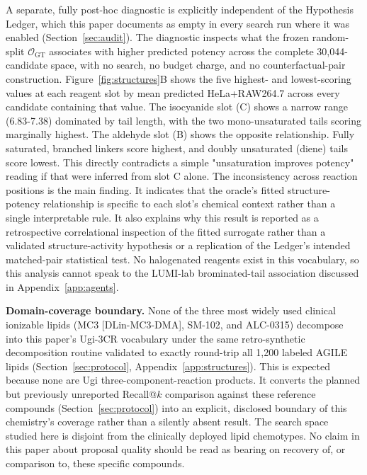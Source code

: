 \documentclass[11pt]{article}
\begin{document}
A separate, fully post-hoc diagnostic is explicitly independent of the Hypothesis Ledger, which this paper documents as empty in every search run where it was enabled (Section~\ref{sec:audit}). The diagnostic inspects what the frozen random-split $\mathcal O_{\mathrm{GT}}$ associates with higher predicted potency across the complete 30,044-candidate space, with no search, no budget charge, and no counterfactual-pair construction. Figure~\ref{fig:structures}B shows the five highest- and lowest-scoring values at each reagent slot by mean predicted HeLa+RAW264.7 across every candidate containing that value. The isocyanide slot (C) shows a narrow range (6.83-7.38) dominated by tail length, with the two mono-unsaturated tails scoring marginally highest. The aldehyde slot (B) shows the opposite relationship. Fully saturated, branched linkers score highest, and doubly unsaturated (diene) tails score lowest. This directly contradicts a simple "unsaturation improves potency" reading if that were inferred from slot C alone. The inconsistency across reaction positions is the main finding. It indicates that the oracle's fitted structure-potency relationship is specific to each slot's chemical context rather than a single interpretable rule. It also explains why this result is reported as a retrospective correlational inspection of the fitted surrogate rather than a validated structure-activity hypothesis or a replication of the Ledger's intended matched-pair statistical test. No halogenated reagents exist in this vocabulary, so this analysis cannot speak to the LUMI-lab brominated-tail association discussed in Appendix~\ref{app:agents}.

\textbf{Domain-coverage boundary.} None of the three most widely used clinical ionizable lipids (MC3 [DLin-MC3-DMA], SM-102, and ALC-0315) decompose into this paper's Ugi-3CR vocabulary under the same retro-synthetic decomposition routine validated to exactly round-trip all 1,200 labeled AGILE lipids (Section~\ref{sec:protocol}, Appendix~\ref{app:structures}). This is expected because none are Ugi three-component-reaction products. It converts the planned but previously unreported Recall@$k$ comparison against these reference compounds (Section~\ref{sec:protocol}) into an explicit, disclosed boundary of this chemistry's coverage rather than a silently absent result. The search space studied here is disjoint from the clinically deployed lipid chemotypes. No claim in this paper about proposal quality should be read as bearing on recovery of, or comparison to, these specific compounds.
\end{document}
